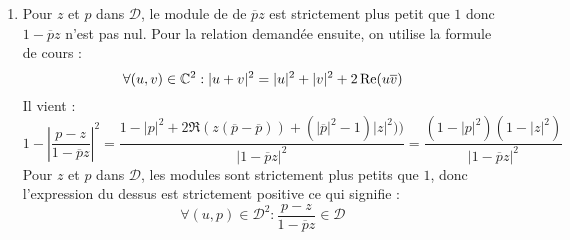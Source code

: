 \begin{enumerate}
 \item Pour $z$ et $p$ dans $\mathcal D$, le module de de $\overline{p}z$ est strictement plus petit que $1$ donc $1-\overline{p}z$ n'est pas nul. Pour la relation demandée ensuite, on utilise la formule de cours :
\begin{displaymath}
 \forall (u,v)\in \mathbb{C}^2 : |u+v|^2 = |u|^2+|v|^2+2\operatorname{Re}(u\overline{v})
\end{displaymath}
Il vient :
\begin{displaymath}
  1-\left\vert  \dfrac{p-z}{1-\overline{p}z} \right\vert ^2
= \dfrac{1-|p|^2 +2\Re(z(\overline{p}-\overline{p})) + (|\overline{p}|^2-1)|z|^2))}{|1-\overline{p}z|^2}
= \dfrac{(1-|p|^2)(1-|z|^2)}{|1-\overline{p}z|^2}
\end{displaymath}
Pour $z$ et $p$ dans $\mathcal D$, les modules sont strictement plus petits que $1$, donc l'expression du dessus est strictement positive ce qui signifie :
\begin{displaymath}
 \forall (u,p)\in \mathcal D^2 : \dfrac{p-z}{1-\overline{p}z} \in \mathcal D
\end{displaymath}


\end{enumerate}
